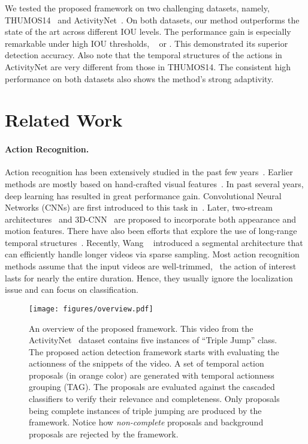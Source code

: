 \documentclass[10pt,twocolumn,letterpaper]{article}
\begin{document}
We tested the proposed framework on two challenging datasets, namely,
THUMOS14~\cite{Jiang2014THUMOS14} and ActivityNet~\cite{caba2015activitynet}.
On both datasets, our method outperforms the state of the art across different IOU levels. 
The performance gain is especially remarkable under high IOU thresholds, \eg~ or .
This demonstrated its superior detection accuracy.
Also note that the temporal structures of the actions in ActivityNet are very 
different from those in THUMOS14. 
The consistent high performance on both datasets also shows the method's strong adaptivity.


 
\section{Related Work}
\label{related}


\paragraph{Action Recognition.}
Action recognition has been extensively studied in the past few years~\cite{Laptev05STIP,WangS13IDT,Simonyan14TwoStream,Tran15C3D,WangQT15TDD,Wang2016TSN,ZhangWW0W16}.
Earlier methods are mostly based on hand-crafted visual features~\cite{Laptev05STIP,WangS13IDT}.
In past several years, deep learning has resulted in great performance gain.
Convolutional Neural Networks (CNNs) are first introduced to this task in~\cite{KarpathyCVPR14Sports1M}.
Later, two-stream architectures~\cite{Simonyan14TwoStream} and 3D-CNN~\cite{Tran15C3D} 
are proposed to incorporate both appearance and motion features.
There have also been efforts that explore the use of long-range temporal structures~\cite{WangQT15TDD,Ng15BeyondSnippet,DonahueJ2015LRCN}.
Recently, Wang \etal~\cite{Wang2016TSN} introduced a segmental architecture
that can efficiently handle longer videos via sparse sampling.
Most action recognition methods assume that the input videos are well-trimmed,
\ie~the action of interest lasts for nearly the entire duration. 
Hence, they usually ignore the localization issue and can focus on classification.


\begin{figure*}[t]
	\centering
	\texttt{[image: figures/overview.pdf]}
	\caption{An overview of the proposed framework. This video from the ActivityNet~\cite{caba2015activitynet} dataset contains five instances of ``Triple Jump'' class. The proposed action detection framework starts with evaluating the actionness of the snippets of the video. 
		A set of temporal action proposals (in orange color) are generated with temporal actionness grouping (TAG). The proposals are evaluated against the cascaded classifiers to verify their relevance and completeness. Only proposals being complete instances of triple jumping are produced by the framework. Notice how \emph{non-complete} proposals and background proposals are rejected by the framework.}
	\label{fig:overview}
\end{figure*}
\end{document}
